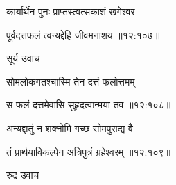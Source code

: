 {\devanagarifont कार्यार्थेन पुनः प्राप्तस्त्वत्सकाशं खगेश्वर \thinspace{\danda} \dontdisplaylinenum }%


{\devanagarifont पूर्वदत्तफलं त्वन्यद्देहि जीवमनाशय {॥१२:१०७॥} \veg\dontdisplaylinenum }%

{\devanagarifont सूर्य उवाच {\dandab}\dontdisplaylinenum  }%
 
{\devanagarifont सोमलोकगतश्चास्मि तेन दत्तं फलोत्तमम् \thinspace{\danda} \dontdisplaylinenum }%


{\devanagarifont स फलं दत्तमेवासि सुहृदत्वान्मया तव {॥१२:१०८॥} \veg\dontdisplaylinenum }%

{\devanagarifont अन्यद्दातुं न शक्नोमि गच्छ सोमपुराद्य वै \thinspace{\dandab} \dontdisplaylinenum }%


{\devanagarifont तं प्रार्थयाविकल्पेन अत्रिपुत्रं ग्रहेश्वरम् {॥१२:१०९॥} \veg\dontdisplaylinenum }%

{\devanagarifont रुद्र उवाच {\dandab}\dontdisplaylinenum  }%

